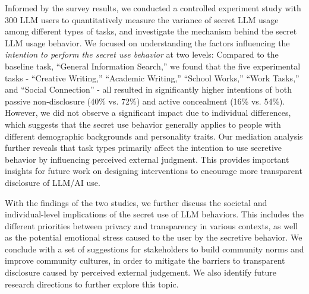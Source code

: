 Informed by the survey results, we conducted a controlled experiment study with 300 LLM users to quantitatively measure the variance of secret LLM usage among different types of tasks, and investigate the mechanism behind the secret LLM usage behavior.
We focused on understanding the factors influencing the \textit{intention to perform the secret use behavior} at two levels: 
Compared to the baseline task, ``General Information Search,'' we found that the five experimental tasks - ``Creative Writing,'' ``Academic Writing,'' ``School Works,'' ``Work Tasks,'' and ``Social Connection'' - all resulted in significantly higher intentions of both passive non-disclosure (40\% vs. 72\%) and active concealment (16\% vs. 54\%).
However, we did not observe a significant impact due to individual differences, which suggests that the secret use behavior generally applies to people with different demographic backgrounds and personality traits.
Our mediation analysis further reveals that task types primarily affect the intention to use secretive behavior by influencing perceived external judgment.
This provides important insights for future work on designing interventions to encourage more transparent disclosure of LLM/AI use.

With the findings of the two studies, we further discuss the societal and individual-level implications of the secret use of LLM behaviors.
This includes the different priorities between privacy and transparency in various contexts, as well as the potential emotional stress caused to the user by the secretive behavior.
We conclude with a set of suggestions for stakeholders to build community norms and improve community cultures, in order to mitigate the barriers to transparent disclosure caused by perceived external judgement.
We also identify future research directions to further explore this topic.


